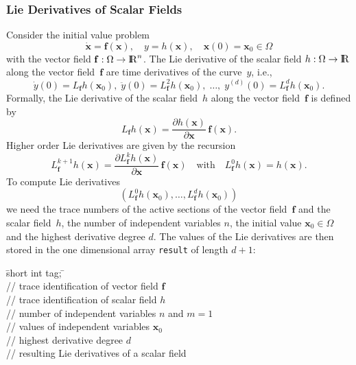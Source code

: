\documentclass[11pt,twoside]{article}
\newcommand{\R}{{ {\rm I} \kern -.225em {\rm R} }}
\begin{document}
\subsubsection*{Lie Derivatives of Scalar Fields}
Consider the initial value problem
\[
 \dot{\mathbf x}={\mathbf f}(\mathbf x),\quad y=h(\mathbf x),\quad \mathbf{x}(0)=\mathbf{x}_0\in\Omega
\]
with the vector field $\mathbf f : \Omega \to \R^n$. The Lie derivative of the scalar field $h:\Omega\to\R$ along the vector field~$\mathbf{f}$ are time derivatives of the curve~$y$, i.e.,
\[
 \dot{y}(0)=L_\mathbf{f}h(\mathbf{x}_0),\;
 \ddot{y}(0)=L_\mathbf{f}^2h(\mathbf{x}_0),\;  \ldots,\;
 y^{(d)}(0)=L_\mathbf{f}^dh(\mathbf{x}_0).
\]
Formally, the Lie derivative of the scalar field~$h$ along the vector field~$\mathbf{f}$ is defined by
\[
 L_{\mathbf f} h(\mathbf x)=\frac{\partial h(\mathbf x)}{\partial \mathbf x}\,\mathbf f(\mathbf x).
\]
Higher order Lie derivatives are given by the recursion
\[
 L_{\mathbf f}^{k+1} h(\mathbf x)= \frac{\partial L_{\mathbf f}^k h(\mathbf x)}{\partial \mathbf x}\,\mathbf f(\mathbf x)\quad\text{with}\quad L_{\mathbf f}^0 h(\mathbf x)= h(\mathbf x).
\]
To compute Lie derivatives
\[
(L_\mathbf f^0h(\mathbf x_0),\ldots,L_\mathbf f^dh(\mathbf x_0))
\]
we need the trace numbers of the active sections of the vector field~$\mathbf f$ and the scalar field~$h$, 
the number of independent variables $n$, the initial value $\mathbf x_0\in\Omega$
and the highest derivative degree $d$. The values of the Lie derivatives are 
then stored in the one dimensional array {\verb=result=} of length $d+1$:

\begin{tabbing}
\hspace{0.5in}\={\sf short int tag;} \hspace{1.1in}\= \kill    %
\\
         \> // trace identification of vector field $\mathbf f$ \\
         \> // trace identification of scalar field $h$\\
               \> // number of independent variables $n$ and $m = 1$\\
          \> // values of independent variables $\mathbf{x}_0$\\
              \> // highest derivative degree $d$\\
    \> // resulting Lie derivatives of a scalar field\\
\end{tabbing}   
\end{document}
